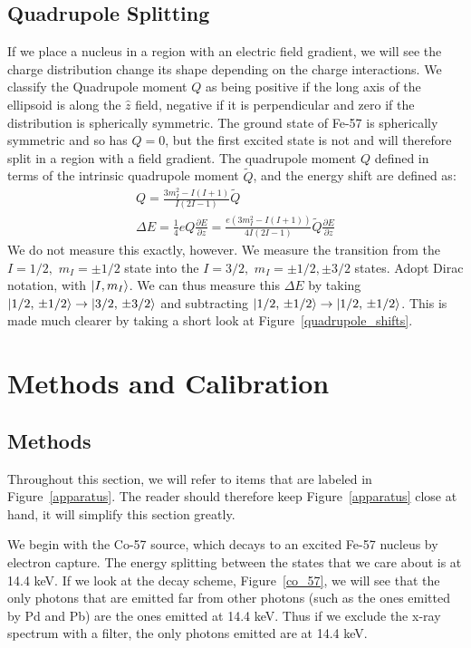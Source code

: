\documentclass[reprint, nobibnotes, amssymb, amsmath, amsfonts, mathtools, mathrsfs, floatfix]{revtex4-1}
\begin{document}
      \subsection{Quadrupole Splitting}
        If we place a nucleus in a region with an electric field gradient, we will see the charge distribution change its shape depending on the charge interactions.  We classify the Quadrupole moment $Q$ as being positive if the long axis of the ellipsoid is along the $\hat{z}$ field, negative if it is perpendicular and zero if the distribution is spherically symmetric.  The ground state of Fe-57 is spherically symmetric and so has $Q = 0$, but the first excited state is not and will therefore split in a region with a field gradient.  The quadrupole moment $Q$ defined in terms of the intrinsic quadrupole moment $\tilde{Q}$, and the energy shift are defined as:
        \begin{gather}
          Q = \frac{3 m_I^2 - I(I+1)}{I(2I-1)}\tilde{Q} \label{quadrupole_moment} \\
          \Delta E = \frac{1}{4}eQ\frac{\partial E}{\partial z} = \frac{e\left(3 m_I^2 - I(I+1)\right)}{4I(2I-1)}\tilde{Q}\frac{\partial E}{\partial z} \label{quadrupole_shift}
        \end{gather}
        We do not measure this exactly, however.  We measure the transition from the $I = 1/2,\,\, m_I = \pm1/2$ state into the $I = 3/2,\,\, m_I = \pm1/2, \pm3/2$ states.  Adopt Dirac notation, with $\ket{I, m_I}$.  We can thus measure this $\Delta E$ by taking $\ket{1/2,\,\pm1/2} \rightarrow \ket{3/2,\,\pm3/2}$ and subtracting $\ket{1/2,\,\pm1/2} \rightarrow \ket{1/2,\,\pm1/2}$.  This is made much clearer by taking a short look at Figure~\ref{quadrupole_shifts}.

  \section{Methods and Calibration}
    \subsection{Methods}
      Throughout this section, we will refer to items that are labeled in Figure~\ref{apparatus}.  The reader should therefore keep Figure~\ref{apparatus} close at hand, it will simplify this section greatly.

      We begin with the Co-57 source, which decays to an excited Fe-57 nucleus by electron capture.  The energy splitting between the states that we care about is at 14.4 keV.  If we look at the decay scheme, Figure~\ref{co_57}, we will see that the only photons that are emitted far from other photons (such as the ones emitted by Pd and Pb) are the ones emitted at 14.4 keV.  Thus if we exclude the x-ray spectrum with a filter, the only photons emitted are at 14.4 keV.
\end{document}
